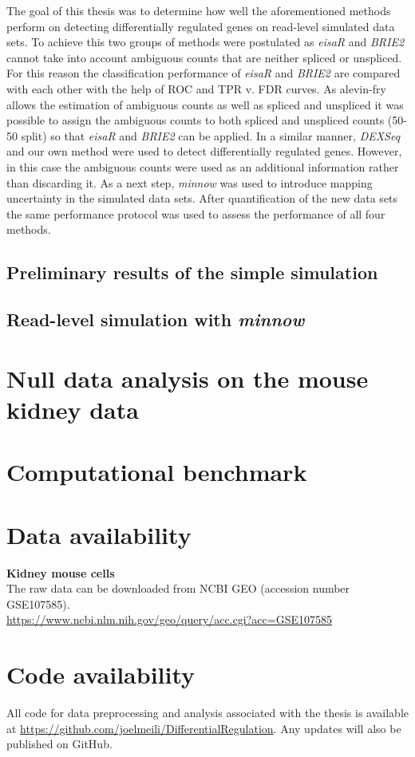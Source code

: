 The goal of this thesis was to determine how well the aforementioned methods perform on detecting differentially regulated genes on read-level simulated data sets. To achieve this two groups of methods were postulated as \emph{eisaR} and \emph{BRIE2} cannot take into account ambiguous counts that are neither spliced or unspliced. For this reason the classification performance of \emph{eisaR} and \emph{BRIE2} are compared with each other with the help of ROC and TPR v. FDR curves. As alevin-fry allows the estimation of ambiguous counts as well as spliced and unspliced it was possible to assign the ambiguous counts to both spliced and unspliced counts (50-50 split) so that \emph{eisaR} and \emph{BRIE2} can be applied. In a similar manner, \emph{DEXSeq} and our own method were used to detect differentially regulated genes. However, in this case the ambiguous counts were used as an additional information rather than discarding it. As a next step, \emph{minnow} was used to introduce mapping uncertainty in the simulated data sets. After quantification of the new data sets the same performance protocol was used to assess the performance of all four methods.

\subsection{Preliminary results of the simple simulation}

\subsection{Read-level simulation with \emph{minnow}}

\section{Null data analysis on the mouse kidney data}

\section{Computational benchmark}

\section{Data availability}

\noindent\textbf{Kidney mouse cells} \\
The raw data can be downloaded from NCBI GEO (accession number GSE107585). \\ 
\url{https://www.ncbi.nlm.nih.gov/geo/query/acc.cgi?acc=GSE107585} \\

\section{Code availability}
All code for data preprocessing and analysis associated with the thesis is available at \url{https://github.com/joelmeili/DifferentialRegulation}. Any updates will also be published on GitHub.
